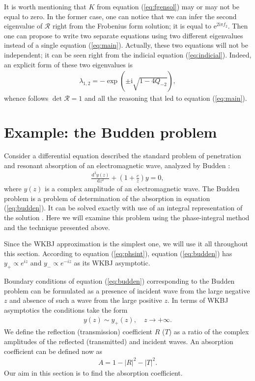 \documentclass[asy]{iosart2x}
\def\rmi{\mathrm{i}}
\def\rme{\mathrm{e}}
\def\rmd{\mathrm{d}}
\def\R{\bm{\mathcal{R}}}
\newcommand\eref[1]{(\ref{#1})}
\begin{document}
It is worth mentioning that $K$ from equation \eref{eq:fgensol} may or may not be equal to zero. In the
former case, one can notice that we can infer the second eigenvalue of $\R$ right from the
Frobenius form solution; it is equal to $\rme^{2 \rmi \pi f_2}$. Then one can propose to write two
separate equations using two different eigenvalues instead of a single equation \eref{eq:main}.
Actually, these two equations will not be independent; it can be seen right from the
indicial equation \eref{eq:indicial}. Indeed, an explicit form of these two eigenvalues is
\begin{eqnarray}
\lambda_{1,2} = - \exp(\pm \rmi \sqrt{1 - 4 Q_{-2}}),
\end{eqnarray}
whence follows $\det\R=1$ and all the reasoning that led to equation \eref{eq:main}.

\section{Example: the Budden problem \label{sec:budden}}
Consider a differential equation described the standard problem of penetration and 
resonant absorption of an electromagnetic wave, analyzed by Budden \cite{white-chen,budden}:
\begin{eqnarray}
\frac{\rmd^2 y(z)}{\rmd z^2} + \left( 1 + \frac{c}{z} \right) y = 0,  
\label{eq:budden}
\end{eqnarray}
where $y(z)$ is a complex amplitude of an electromagnetic wave.
The Budden problem is a problem of determination of the absorption in equation \eref{eq:budden}. 
It can be solved exactly with use of an integral representation of the solution \cite{rwbook}.
Here we will examine this problem using the phase-integral method and the technique presented above. 

Since the WKBJ approximation is the simplest one,
we will use it all throughout this section. According to equation \eref{eq:phsint}, 
equation \eref{eq:budden} has $y_+ \propto e^{iz}$ and $y_- \propto e^{-iz}$ as its WKBJ asymptotic. 

Boundary conditions of equation \eref{eq:budden} corresponding to the Budden problem can be
formulated as a presence of incident wave from the large negative $z$ and absence of such 
a wave from the large positive $z$. In terms of WKBJ asymptotics the conditions take the form
\begin{eqnarray}
y(z) \sim y_+(z), \quad z \rightarrow +\infty.  
\label{eq:bbound}
\end{eqnarray}
We define the reflection (transmission) coefficient $R$ ($T$) as
a ratio of the complex amplitudes of the reflected (transmitted) and incident waves. 
An absorption coefficient can be defined now as 
\begin{eqnarray}
A = 1 - |R|^2 - |T|^2.  
\label{eq:absdef}
\end{eqnarray}
Our aim in this section is to find the absorption coefficient.
\end{document}
